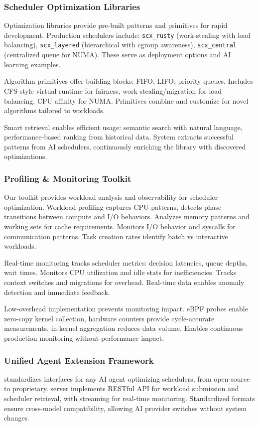 \subsubsection{Scheduler Optimization Libraries}
Optimization libraries provide pre-built patterns and primitives for rapid development. Production schedulers include: \texttt{scx\_rusty} (work-stealing with load balancing), \texttt{scx\_layered} (hierarchical with cgroup awareness), \texttt{scx\_central} (centralized queue for NUMA). These serve as deployment options and AI learning examples.

Algorithm primitives offer building blocks: FIFO, LIFO, priority queues. Includes CFS-style virtual runtime for fairness, work-stealing/migration for load balancing, CPU affinity for NUMA. Primitives combine and customize for novel algorithms tailored to workloads.

Smart retrieval enables efficient usage: semantic search with natural language, performance-based ranking from historical data. System extracts successful patterns from AI schedulers, continuously enriching the library with discovered optimizations.

\subsubsection{Profiling \& Monitoring Toolkit}
Our toolkit provides workload analysis and observability for scheduler optimization. Workload profiling captures CPU patterns, detects phase transitions between compute and I/O behaviors. Analyzes memory patterns and working sets for cache requirements. Monitors I/O behavior and syscalls for communication patterns. Task creation rates identify batch vs interactive workloads.

Real-time monitoring tracks scheduler metrics: decision latencies, queue depths, wait times. Monitors CPU utilization and idle stats for inefficiencies. Tracks context switches and migrations for overhead. Real-time data enables anomaly detection and immediate feedback.

Low-overhead implementation prevents monitoring impact. eBPF probes enable zero-copy kernel collection, hardware counters provide cycle-accurate measurements, in-kernel aggregation reduces data volume. Enables continuous production monitoring without performance impact.

\subsubsection{Unified Agent Extension Framework}
\sys standardizes interfaces for any AI agent optimizing schedulers, from open-source to proprietary. \sys server implements RESTful API for workload submission and scheduler retrieval, with streaming for real-time monitoring. Standardized formats ensure cross-model compatibility, allowing AI provider switches without system changes.

